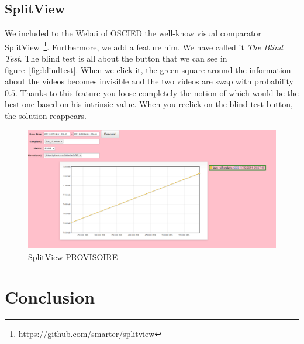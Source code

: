 \documentclass[a4paper,12pt]{article}
\begin{document}
\subsection{SplitView}
We included to the Webui of OSCIED the well-know visual comparator SplitView~\footnote{\url{https://github.com/smarter/splitview}}. Furthermore, we add a feature him. We have called it \emph{The Blind Test}. The blind test is all about the button that we can see in figure~\ref{fig:blindtest}. When we click it, the green square around the information about the videos becomes invisible and the two videos are swap with probability $0.5$. Thanks to this feature you loose completely the notion of which would be the best one based on his intrinsic value. When you reclick on the blind test button, the solution reappears.

\begin{figure}[!h]
	\centering
	\includegraphics[width=1\textwidth]{figures/graph1.png}
	\caption{SplitView PROVISOIRE}
	\label{fig:graph1}
\end{figure}




\section{Conclusion}
\end{document}
